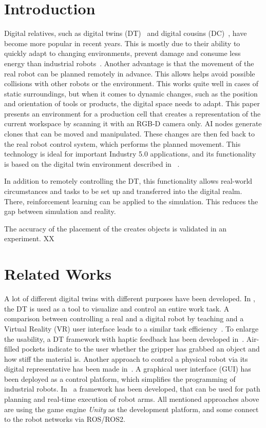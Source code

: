 \documentclass{bmvc2k}
\begin{document}
\section{Introduction}
\label{sec:intro}
Digital relatives, such as digital twins (DT)~\cite{singh_digital_2021} and digital cousins (DC)~\cite{dai2024automated}, have become more popular in recent years. This is mostly due to their ability to quickly adapt to changing environments, prevent damage and consume less energy than industrial robots~\cite{landscheidt_method_2016}. Another advantage is that the movement of the real robot can be planned remotely in advance. This allows helps avoid possible collisions with other robots or the environment. This works quite well in cases of static surroundings, but when it comes to dynamic changes, such as the position and orientation of tools or products, the digital space needs to adapt. This paper presents an environment for a production cell that creates a representation of the current workspace by scanning it with an RGB-D camera only. AI nodes generate clones that can be moved and manipulated. These changes are then fed back to the real robot control system, which performs the planned movement. This technology is ideal for important Industry 5.0 applications, and its functionality is based on the digital twin environment described in ~\cite{herrmann2025realtime}.

In addition to remotely controlling the DT, this functionality allows real-world circumstances and tasks to be set up and transferred into the digital realm. There, reinforcement learning can be applied to the simulation. This reduces the gap between simulation and reality.


The accuracy of the placement of the creates objects is validated in an experiment. XX


\section{Related Works}
\label{sec:SOTA}
A lot of different digital twins with different purposes have been developed. In \cite{xiang_development_2024}, the DT is used as a tool to visualize and control an entire work task. A comparison between controlling a real and a digital robot by teaching and a Virtual Reality (VR) user interface leads to a similar task efficiency~\cite{kuts_digital_2022}. To enlarge the usability, a DT framework with haptic feedback has been developed in~\cite{fan_digital_2023}. Air-filled pockets indicate to the user whether the gripper has grabbed an object and how stiff the material is. Another approach to control a physical robot via its digital representative has been made in~\cite{chang_construction_2025}. A graphical user interface (GUI) has been deployed as a control platform, which simplifies the programming of industrial robots. In~\cite{kawshan_digital_2026} a framework has been developed, that can be used for path planning and real-time execution of robot arms.
All mentioned approaches above are using the game engine \textit{Unity} as the development platform, and some connect to the robot networks via ROS/ROS2.
\end{document}
